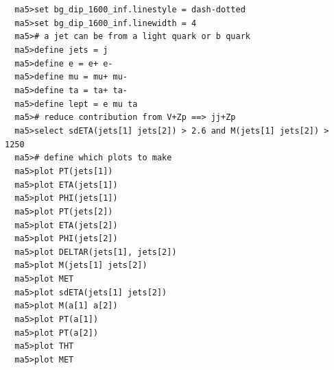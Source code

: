 \documentclass[a4paper, 10pt]{article}
\begin{document}
\texttt{ }\texttt{ }\texttt{ma5>set bg\_dip\_1600\_inf.linestyle = dash-dotted\\
}
\texttt{ }\texttt{ }\texttt{ma5>set bg\_dip\_1600\_inf.linewidth = 4\\
}
\texttt{ }\texttt{ }\texttt{ma5>\# a jet can be from a light quark or b quark\\
}
\texttt{ }\texttt{ }\texttt{ma5>define jets = j\\
}
\texttt{ }\texttt{ }\texttt{ma5>define e = e+ e-\\
}
\texttt{ }\texttt{ }\texttt{ma5>define mu = mu+ mu-\\
}
\texttt{ }\texttt{ }\texttt{ma5>define ta = ta+ ta-\\
}
\texttt{ }\texttt{ }\texttt{ma5>define lept = e mu ta\\
}
\texttt{ }\texttt{ }\texttt{ma5>\# reduce contribution from V+Zp ==> jj+Zp\\
}
\texttt{ }\texttt{ }\texttt{ma5>select sdETA(jets[1] jets[2]) > 2.6 and M(jets[1] jets[2]) > 1250\\
}
\texttt{ }\texttt{ }\texttt{ma5>\# define which plots to make\\
}
\texttt{ }\texttt{ }\texttt{ma5>plot PT(jets[1])\\
}
\texttt{ }\texttt{ }\texttt{ma5>plot ETA(jets[1])\\
}
\texttt{ }\texttt{ }\texttt{ma5>plot PHI(jets[1])\\
}
\texttt{ }\texttt{ }\texttt{ma5>plot PT(jets[2])\\
}
\texttt{ }\texttt{ }\texttt{ma5>plot ETA(jets[2])\\
}
\texttt{ }\texttt{ }\texttt{ma5>plot PHI(jets[2])\\
}
\texttt{ }\texttt{ }\texttt{ma5>plot DELTAR(jets[1], jets[2])\\
}
\texttt{ }\texttt{ }\texttt{ma5>plot M(jets[1] jets[2])\\
}
\texttt{ }\texttt{ }\texttt{ma5>plot MET\\
}
\texttt{ }\texttt{ }\texttt{ma5>plot sdETA(jets[1] jets[2])\\
}
\texttt{ }\texttt{ }\texttt{ma5>plot M(a[1] a[2])\\
}
\texttt{ }\texttt{ }\texttt{ma5>plot PT(a[1])\\
}
\texttt{ }\texttt{ }\texttt{ma5>plot PT(a[2])\\
}
\texttt{ }\texttt{ }\texttt{ma5>plot THT\\
}
\texttt{ }\texttt{ }\texttt{ma5>plot MET\\
}
\end{document}

